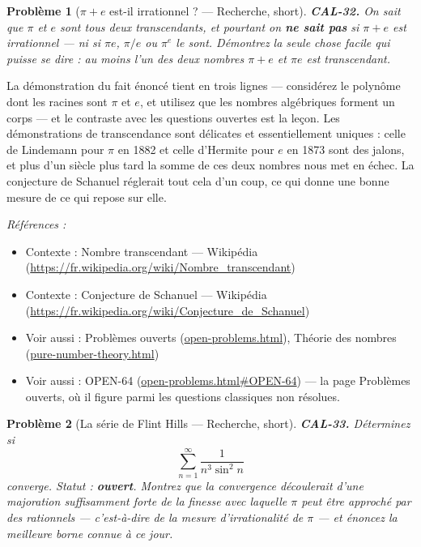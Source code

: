 \documentclass[11pt]{article}
\newtheorem{problem}{Problème}
\newenvironment{refs}{\par\small\noindent\emph{Références :}\begin{itemize}\setlength\itemsep{0pt}}{\end{itemize}\normalsize}
\begin{document}
\bigskip

\begin{problem}[{$ \pi + e $ est-il irrationnel ? --- Recherche, short}]
\textbf{CAL-32.} On sait que $ \pi $ et $ e $ sont tous deux
transcendants, et pourtant on \textbf{ne sait pas} si $ \pi + e $ est irrationnel --- ni
si $ \pi e $, $ \pi/e $ ou $ \pi^{e} $ le sont. Démontrez la seule chose facile qui
\textit{puisse} se dire : au moins l'un des deux nombres $ \pi + e $ et $ \pi e $ est transcendant.
\end{problem}

\noindent La démonstration du fait énoncé tient en trois lignes --- considérez le polynôme
dont les racines sont $ \pi $ et $ e $, et utilisez que les nombres algébriques forment
un corps --- et le contraste avec les questions ouvertes est la leçon. Les démonstrations de transcendance sont
délicates et essentiellement uniques : celle de Lindemann pour $ \pi $ en 1882 et celle d'Hermite pour
$ e $ en 1873 sont des jalons, et plus d'un siècle plus tard la somme de ces deux nombres
nous met en échec. La conjecture de Schanuel réglerait tout cela d'un coup, ce qui donne une bonne
mesure de ce qui repose sur elle.

\begin{refs}
\item Contexte : Nombre transcendant --- Wikipédia (\url{https://fr.wikipedia.org/wiki/Nombre_transcendant})
\item Contexte : Conjecture de Schanuel --- Wikipédia (\url{https://fr.wikipedia.org/wiki/Conjecture_de_Schanuel})
\item Voir aussi : Problèmes ouverts (\url{open-problems.html}), Théorie des nombres (\url{pure-number-theory.html})
\item Voir aussi : OPEN-64 (\url{open-problems.html#OPEN-64}) --- la page Problèmes ouverts, où il figure parmi les questions classiques non résolues.
\end{refs}

\bigskip

\begin{problem}[{La série de Flint Hills --- Recherche, short}]
\textbf{CAL-33.} Déterminez si
\[ \sum_{n=1}^{\infty} \frac{1}{n^{3} \sin^{2} n} \]
converge. Statut : \textbf{ouvert}. Montrez que la convergence découlerait d'une majoration suffisamment
forte de la finesse avec laquelle $ \pi $ peut être approché par des rationnels --- c'est-à-dire de la
mesure d'irrationalité de $ \pi $ --- et énoncez la meilleure borne connue à ce jour.
\end{problem}
\end{document}
